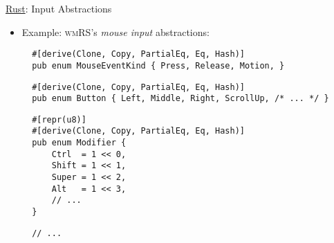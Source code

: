 \begin{frame}[fragile]{\underline{Rust}: Input Abstractions \hfill {\footnotesize \currentname}}


    \begin{itemize}

        \item Example: \textsc{wmRS}'s \textit{mouse input} abstractions:\\[3pt]
\begin{verbatim}
  #[derive(Clone, Copy, PartialEq, Eq, Hash)]
  pub enum MouseEventKind { Press, Release, Motion, }
\end{verbatim}
\begin{verbatim}
  #[derive(Clone, Copy, PartialEq, Eq, Hash)]
  pub enum Button { Left, Middle, Right, ScrollUp, /* ... */ }
\end{verbatim}
\begin{verbatim}
  #[repr(u8)]
  #[derive(Clone, Copy, PartialEq, Eq, Hash)]
  pub enum Modifier {
      Ctrl  = 1 << 0,
      Shift = 1 << 1,
      Super = 1 << 2,
      Alt   = 1 << 3,
      // ...
  }
\end{verbatim}
\begin{verbatim}
  // ...
\end{verbatim}

    \end{itemize}

    \vfill

\end{frame}

